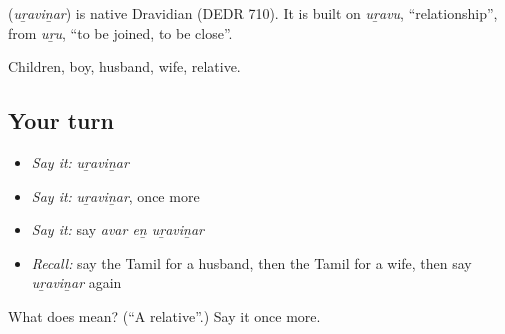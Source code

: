 \begin{cousinweb}
\textbf{} (\emph{uṟaviṉar}) is native Dravidian (DEDR 710). It is built on \emph{uṟavu}, \textquotedblleft{}relationship\textquotedblright{}, from \emph{uṟu}, \textquotedblleft{}to be joined, to be close\textquotedblright{}.
\end{cousinweb}

\begin{grammarlens}[title={What you've built}]
Children, boy, husband, wife, relative.
\end{grammarlens}

\subsection*{Your turn}
\begin{itemize}
\raggedright
  \item \emph{Say it:} \emph{uṟaviṉar}
  \item \emph{Say it:} \emph{uṟaviṉar}, once more
  \item \emph{Say it:} say \emph{avar eṉ uṟaviṉar}
  \item \emph{Recall:} say the Tamil for a husband, then the Tamil for a wife, then say \emph{uṟaviṉar} again
\end{itemize}

\begin{tcolorbox}[breakable,colback=teal!4,colframe=teal!35!black,title={Before you move on}]
What does  mean? (\textquotedblleft{}A relative\textquotedblright{}.) Say it once more.
\end{tcolorbox}

